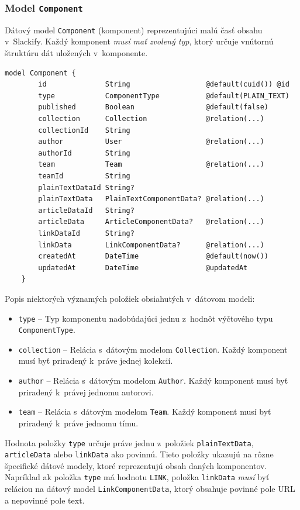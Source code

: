 \subsubsection{Model \texttt{Component}}
\label{impl:model:component}
Dátový model \texttt{Component} (komponent) reprezentujúci malú časť obsahu v~Slackify. Každý komponent \emph{musí mať zvolený typ}, ktorý určuje vnútornú štruktúru dát uložených v~komponente. \\

\begin{lstlisting}[language={Prisma}, caption=Dátový model \texttt{Component} v~konfiguračnom súbore \texttt{prisma}.]
	model Component {
		id              String                  @default(cuid()) @id
		type            ComponentType           @default(PLAIN_TEXT)
		published       Boolean                 @default(false)
		collection      Collection              @relation(...)
		collectionId    String
		author          User                    @relation(...)
		authorId        String
		team            Team                    @relation(...)
		teamId          String
		plainTextDataId String?
		plainTextData   PlainTextComponentData? @relation(...)
		articleDataId   String?
		articleData     ArticleComponentData?   @relation(...)
		linkDataId      String?
		linkData        LinkComponentData?      @relation(...)
		createdAt       DateTime                @default(now())
		updatedAt       DateTime                @updatedAt
	}
\end{lstlisting}

\medskip

\noindent Popis niektorých významých položiek obsiahutých v~dátovom modeli:

\begin{itemize}
	\item \texttt{type} -- Typ komponentu nadobúdajúci jednu z~hodnôt výčtového typu \texttt{ComponentType}.
	\item \texttt{collection} -- Relácia s~dátovým modelom \texttt{Collection}. Každý komponent musí byť priradený k~práve jednej kolekcií.
	\item \texttt{author} -- Relácia s~dátovým modelom \texttt{Author}. Každý komponent musí byť priradený k~právej jednomu autorovi.
	\item \texttt{team} -- Relácia s~dátovým modelom \texttt{Team}. Každý komponent musí byť priradený k~práve jednomu tímu.
\end{itemize}

\noindent Hodnota položky \texttt{type} určuje práve jednu z~položiek \texttt{plainTextData}, \texttt{articleData} alebo \texttt{linkData} ako povinnú. Tieto položky ukazujú na rôzne špecifické dátové modely, ktoré reprezentujú obsah daných komponentov. Napríklad ak položka \texttt{type} má hodnotu \texttt{LINK}, položka \texttt{linkData} \emph{musí} byť reláciou na dátový model \texttt{LinkComponentData}, ktorý obsahuje povinné pole URL a nepovinné pole text. \\

